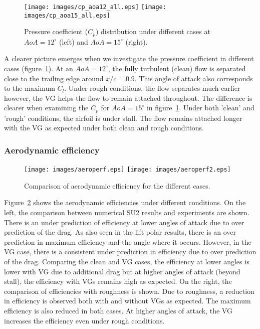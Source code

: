 \begin{figure}[h]
    \centering
    \captionsetup{justification=centering}
    \texttt{[image: images/cp\_aoa12\_all.eps]}
    \texttt{[image: images/cp\_aoa15\_all.eps]} 
    \caption{Pressure coefficient ($C_p$) distribution under different cases at $AoA = 12^{\circ}$ (left) and $AoA = 15^{\circ}$ (right).}
   \label{fig:cpallaoa}
\end{figure}

A clearer picture emerges when we investigate the pressure coefficient in different cases (figure~\ref{fig:cpallaoa}). At an $AoA=12^{\circ}$, the fully turbulent (clean) flow is separated close to the trailing edge around $x/c=0.9$. This angle of attack also corresponds to the maximum $C_l$. Under rough conditions, the flow separates much earlier however, the VG helps the flow to remain attached throughout. The difference is clearer when examining the $C_p$ for $AoA=15^{\circ}$ in figure~\ref{fig:cpallaoa}. Under both 'clean' and 'rough' conditions, the airfoil is under stall. The flow remains attached longer with the VG as expected under both clean and rough conditions. 
\subsubsection{Aerodynamic efficiency}
\begin{figure}[h]
    \centering
    \captionsetup{justification=centering}
    \texttt{[image: images/aeroperf.eps]}
    \texttt{[image: images/aeroperf2.eps]} 
    \caption{Comparison of aerodynamic efficiency for the different cases.}
   \label{fig:aeroeff}
\end{figure}
Figure~\ref{fig:aeroeff} shows the aerodynamic efficiencies under different conditions. On the left, the comparison between numerical SU2 results and experiments are shown. There is an under prediction of efficiency at lower angles of attack due to over prediction of the drag. As also seen in the lift polar results, there is an over prediction in maximum efficiency and the angle where it occurs. However, in the VG case, there is a consistent under prediction in efficiency due to over prediction of the drag. Comparing the clean and VG cases, the efficiency at lower angles is lower with VG due to additional drag but at higher angles of attack (beyond stall), the efficiency with VGs remains high as expected. On the right, the comparison of efficiencies with roughness is shown. Due to roughness, a reduction in efficiency is observed both with and without VGs as expected. The maximum efficiency is also reduced in both cases. At higher angles of attack, the VG increases the efficiency even under rough conditions.

